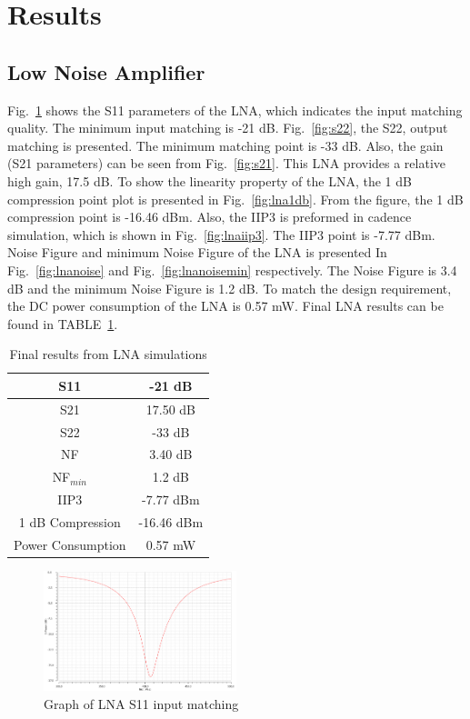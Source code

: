 \section{Results}
\subsection{Low Noise Amplifier}
Fig.~\ref{fig:s11} shows the S11 parameters of the LNA, which indicates the input matching quality. The minimum input matching is -21 dB. Fig.~\ref{fig:s22}, the S22, output matching is presented. The minimum matching point is -33 dB. Also, the gain (S21 parameters) can be seen from Fig.~\ref{fig:s21}. This LNA provides a relative high gain, 17.5 dB. To show the linearity property of the LNA, the 1 dB compression point plot is presented in Fig.~\ref{fig:lna1db}. From the figure, the 1 dB compression point is -16.46 dBm. Also, the IIP3 is preformed in cadence simulation, which is shown in Fig.~\ref{fig:lnaiip3}. The IIP3 point is -7.77 dBm. Noise Figure and minimum Noise Figure of the LNA is presented In Fig.~\ref{fig:lnanoise} and Fig.~\ref{fig:lnanoisemin} respectively. The Noise Figure is 3.4 dB and the minimum Noise Figure is 1.2 dB. To match the design requirement, the DC power consumption of the LNA is 0.57 mW. Final LNA results can be found in TABLE~\ref{tab:lnaresults}.

\begin{table}[H]
\caption{Final results from LNA simulations}
\label{tab:lnaresults}
\begin{center}
	\begin{tabular}{ c | c  }
 		                      
  		S11 & -21 dB \\ \hline
  		S21 &  17.50 dB \\ \hline
  		S22 & -33 dB \\ \hline
		NF & 3.40 dB\\ \hline
		NF$_{min}$ & 1.2 dB \\ \hline
		IIP3 & -7.77 dBm\\ \hline
		1 dB Compression & -16.46 dBm \\  \hline
		Power Consumption & 0.57 mW \\ 

	\end{tabular}

\end{center}
\end{table}

\begin{figure}[h]
   \centering
    \includegraphics[width=0.5\textwidth]{figures/s11.png}
    \caption{Graph of LNA S11 input matching}
    \label{fig:s11}
\end{figure}

